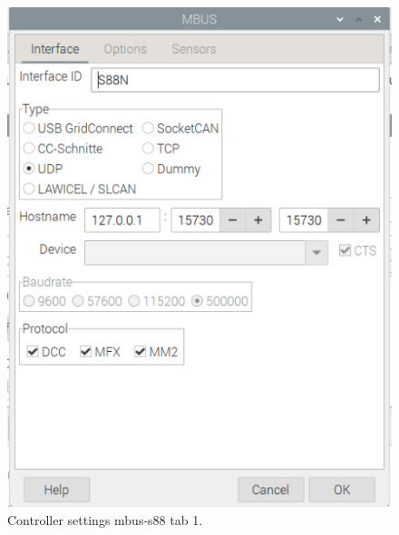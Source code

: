 \begin{figure}[h!]
	\centering
	\includegraphics[width=1.00\linewidth]{../figures/rocrailcontrollersettings/S88N_settings_tab1.png}
	\caption{Controller settings mbus-s88 tab 1.}
	\label{fig:S88N_settings_tab1}
\end{figure}

